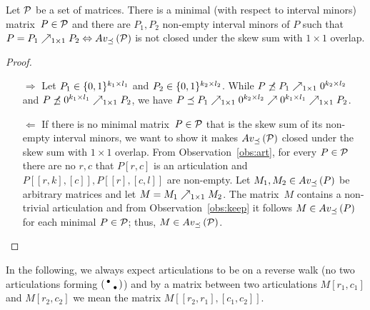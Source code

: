 \begin{obs}
\label{obs:rel}
Let $\mathcal{P}$ be a set of matrices. There is a minimal (with respect to interval minors) matrix~$P\in\mathcal{P}$ and there are $P_1,P_2$ non-empty interval minors of $P$ such that $P=P_1\nearrow_{1\times1}P_2\Leftrightarrow Av_{\preceq}\left(\mathcal{P}\right)$ is not closed under the skew sum with $1\times1$ overlap.
\end{obs}
\begin{proof}
\begin{itemize}
	\item[$\Rightarrow$] Let $P_1\in\{0,1\}^{k_1\times l_1}$ and $P_2\in\{0,1\}^{k_2\times l_2}$. While $P\not\preceq P_1\nearrow_{1\times1}0^{k_2\times l_2}$ and $P\not\preceq0^{k_1\times l_1}\nearrow_{1\times1}P_2$, we have $P\preceq P_1\nearrow_{1\times1}0^{k_2\times l_2}\nearrow0^{k_1\times l_1}\nearrow_{1\times1}P_2$.
	\item[$\Leftarrow$] If there is no minimal matrix~$P\in\mathcal{P}$ that is the skew sum of its non-empty interval minors, we want to show it makes $Av_{\preceq}\left(\mathcal{P}\right)$ closed under the skew sum with $1\times1$ overlap. From Observation~\ref{obs:art}, for every $P\in\mathcal{P}$ there are no $r,c$ that $P[r,c]$ is an articulation and $P[[r,k],[c]],P[[r],[c,l]]$ are non-empty. Let $M_1,M_2\in Av_{\preceq}\left(P\right)$ be arbitrary matrices and let $M=M_1\nearrow_{1\times1}M_2$. The matrix~$M$ contains a non-trivial articulation and from Observation~\ref{obs:keep} it follows $M\in Av_{\preceq}\left(P\right)$ for each minimal $P\in\mathcal{P}$; thus, $M\in Av_{\preceq}\left(\mathcal{P}\right)$. \qedhere
\end{itemize}
\end{proof}

In the following, we always expect articulations to be on a reverse walk (no two articulations forming $\left(\begin{smallmatrix}\bullet& \\ &\bullet\end{smallmatrix}\right)$) and by a matrix between two articulations $M[r_1,c_1]$ and $M[r_2,c_2]$ we mean the matrix $M[[r_2,r_1],[c_1,c_2]]$.

